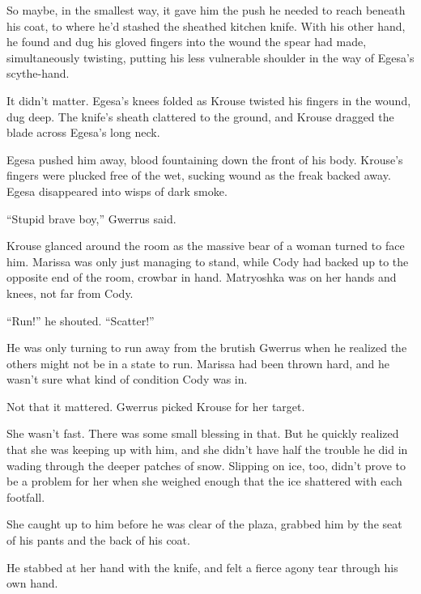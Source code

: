So maybe, in the smallest way, it gave him the push he needed to reach beneath his coat, to where he'd stashed the sheathed kitchen knife.  With his other hand, he found and dug his gloved fingers into the wound the spear had made, simultaneously twisting, putting his less vulnerable shoulder in the way of Egesa's scythe-hand.



It didn't matter.  Egesa's knees folded as Krouse twisted his fingers in the wound, dug deep.  The knife's sheath clattered to the ground, and Krouse dragged the blade across Egesa's long neck.



Egesa pushed him away, blood fountaining down the front of his body.  Krouse's fingers were plucked free of the wet, sucking wound as the freak backed away.  Egesa disappeared into wisps of dark smoke.



``Stupid brave boy,'' Gwerrus said.



Krouse glanced around the room as the massive bear of a woman turned to face him.  Marissa was only just managing to stand, while Cody had backed up to the opposite end of the room, crowbar in hand.  Matryoshka was on her hands and knees, not far from Cody.



``Run!'' he shouted.  ``Scatter!''



He was only turning to run away from the brutish Gwerrus when he realized the others might not be in a state to run.  Marissa had been thrown hard, and he wasn't sure what kind of condition Cody was in.



Not that it mattered.  Gwerrus picked Krouse for her target.



She wasn't fast.  There was some small blessing in that.  But he quickly realized that she was keeping up with him, and she didn't have half the trouble he did in wading through the deeper patches of snow.  Slipping on ice, too, didn't prove to be a problem for her when she weighed enough that the ice shattered with each footfall.



She caught up to him before he was clear of the plaza, grabbed him by the seat of his pants and the back of his coat.



He stabbed at her hand with the knife, and felt a fierce agony tear through his own hand.



